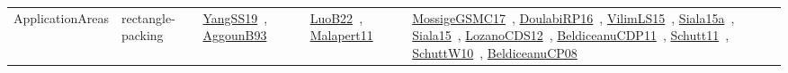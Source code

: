 {\begin{longtable}{lp{3cm}>{\raggedright\arraybackslash}p{6cm}>{\raggedright\arraybackslash}p{6cm}>{\raggedright\arraybackslash}p{8cm}}
ApplicationAreas & rectangle-packing & \href{../works/YangSS19.pdf}{YangSS19}~\cite{YangSS19}, \href{../works/AggounB93.pdf}{AggounB93}~\cite{AggounB93} & \href{../works/LuoB22.pdf}{LuoB22}~\cite{LuoB22}, \href{../works/Malapert11.pdf}{Malapert11}~\cite{Malapert11} & \href{../works/MossigeGSMC17.pdf}{MossigeGSMC17}~\cite{MossigeGSMC17}, \href{../works/DoulabiRP16.pdf}{DoulabiRP16}~\cite{DoulabiRP16}, \href{../works/VilimLS15.pdf}{VilimLS15}~\cite{VilimLS15}, \href{../works/Siala15a.pdf}{Siala15a}~\cite{Siala15a}, \href{../works/Siala15.pdf}{Siala15}~\cite{Siala15}, \href{../works/LozanoCDS12.pdf}{LozanoCDS12}~\cite{LozanoCDS12}, \href{../works/BeldiceanuCDP11.pdf}{BeldiceanuCDP11}~\cite{BeldiceanuCDP11}, \href{../works/Schutt11.pdf}{Schutt11}~\cite{Schutt11}, \href{../works/SchuttW10.pdf}{SchuttW10}~\cite{SchuttW10}, \href{../works/BeldiceanuCP08.pdf}{BeldiceanuCP08}~\cite{BeldiceanuCP08}\\

\end{longtable}}
